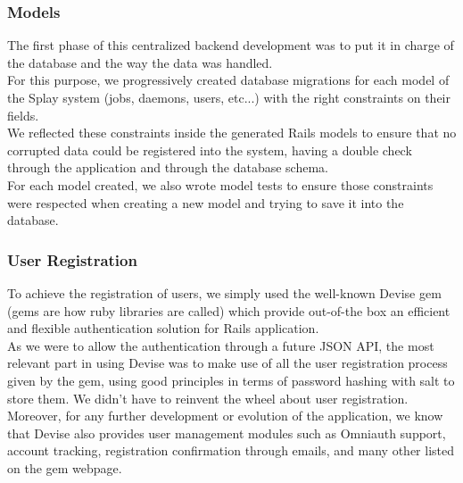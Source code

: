 \documentclass{eplmastersthesis}
\begin{document}
        \subsubsection{Models}

          The first phase of this centralized backend development was to
          put it in charge of the database and the way the data was handled.\\

          For this purpose, we progressively created database migrations
          for each model of the Splay system (jobs, daemons, users, etc...)
          with the right constraints on their fields.\\
          We reflected these constraints inside the generated Rails models to
          ensure that no corrupted data could be registered into the system,
          having a double check through the application and through the
          database schema.\\
          For each model created, we also wrote model tests to ensure those
          constraints were respected when creating a new model and trying
          to save it into the database.

        \subsubsection{User Registration}

          To achieve the registration of users, we simply used the
          well-known Devise \cite{devise} gem (gems are how ruby libraries are
          called) which provide out-of-the box an efficient and flexible
          authentication solution for Rails application.\\
          As we were to allow the authentication through a future JSON API,
          the most relevant part in using Devise was to make use of all
          the user registration process given by the gem, using good principles
          in terms of password hashing with salt to store them. We didn't
          have to reinvent the wheel about user registration.\\

          Moreover, for any further development or evolution of the application,
          we know that Devise also provides user management modules such as
          Omniauth support, account tracking, registration confirmation
          through emails, and many other listed on the gem webpage.\\
\end{document}
